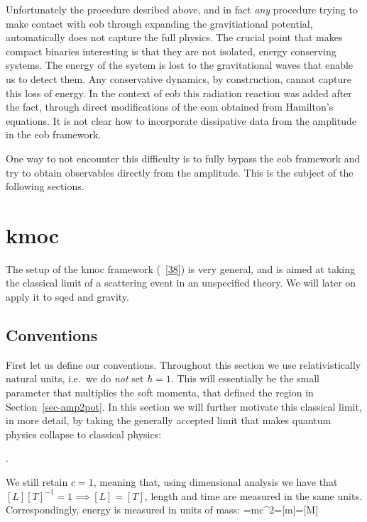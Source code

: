 \documentclass[
  10pt,
  a4paper,
  DIV=11,
  numbers=noendperiod,
  oneside]{scrreprt}
\let\[\relax \let\]\relax %
\DeclareRobustCommand{\[}{\begin{equation}}
\DeclareRobustCommand{\]}{\end{equation}}
\begin{document}
Unfortunately the procedure desribed above, and in fact \emph{any}
procedure trying to make contact with \gls{eob} through expanding the
gravitiational potential, automatically does not capture the full
physics. The crucial point that makes compact binaries interesting is
that they are not isolated, energy conserving systems. The energy of the
system is lost to the gravitational waves that enable us to detect them.
Any conservative dynamics, by construction, cannot capture this loss of
energy. In the context of \gls{eob} this radiation reaction was added
after the fact, through direct modifications of the \gls{eom} obtained
from Hamilton's equations. It is not clear how to incorporate
dissipative data from the amplitude in the \gls{eob} framework.

One way to not encounter this difficulty is to fully bypass the
\gls{eob} framework and try to obtain observables directly from the
amplitude. This is the subject of the following sections.

\hypertarget{sec-kmoc}{%
\section{\texorpdfstring{\gls{kmoc}}{}}\label{sec-kmoc}}

The setup of the \gls{kmoc} framework
(~{[}\protect\hyperlink{ref-Kosower:2018adc}{38}{]}) is very general,
and is aimed at taking the classical limit of a scattering event in an
unspecified theory. We will later on apply it to \gls{sqed} and gravity.

\hypertarget{conventions}{%
\subsection{Conventions}\label{conventions}}

First let us define our conventions. Throughout this section we use
relativistically natural units, i.e.~we do \emph{not} set \(\hbar=1\).
This will essentially be the small parameter that multiplies the soft
momenta, that defined the region in Section~\ref{sec-amp2pot}. In this
section we will further motivate this classical limit, in more detail,
by taking the generally accepted limit that makes quantum physics
collapse to classical physics:

\[\hbar{}.\]

We still retain \(c=1\), meaning that, using dimensional analysis we
have that \([L][T]^{-1}=1 \implies [L]=[T]\), length and time are
measured in the same units. Correspondingly, energy is measured in units
of mass: \[
\energy=mc^2\implies[\energy]=[m]=[M]
\]
\end{document}
